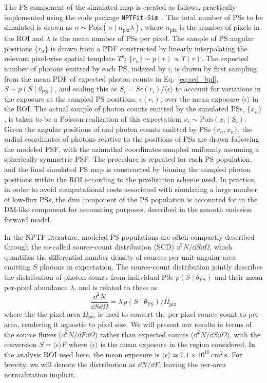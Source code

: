 \documentclass[prd,aps,10pt,nofootinbib,twocolumn,superscriptaddress,preprintnumbers,balancelastpage,longbibliography]{revtex4-1}
\begin{document}
The PS component of the simulated \Fermi map is created as follows, practically implemented using the code package \texttt{NPTFit-Sim}~\cite{NPTFit-Sim}. The total number of PSs to be simulated is drawn as $n \sim \mathrm{Pois}(n\mid n_\mathrm{pix}\lambda)$, where $n_\mathrm{pix}$ is the number of pixels in the ROI and $\lambda$ is the mean number of PSs per pixel. The sample of PS angular positions $\{r_n\}$ is drawn from a PDF constructed by linearly interpolating the relevant pixel-wise spatial template $T^p$; $\{r_n\} \sim p(r) \propto T(r)$. The expected number of photons emitted by each PS, indexed by $i$, is drawn by first sampling from the mean PDF of expected photon counts in Eq.~\eqref{eq:scd_bpl}, $S \sim p\left({S}\mid\theta_\mathrm{PS}\right)$, and scaling this as ${S_i} = S \epsilon(r_i) / \langle \epsilon \rangle$ to account for variations in the \Fermi exposure at the sampled PS positions, $\epsilon(r_i)$, over the mean exposure $\langle \epsilon \rangle$ in the ROI. The actual sample of photon counts emitted by the simulated PSs, $\{x_n\}$, is taken to be a Poisson realization of this expectation; ${x_i} \sim \mathrm{Pois}\left({x_i}\mid {S_i}\right)$. Given the angular positions of and photon counts emitted by PSs $\{r_n, x_n\}$, the radial coordinates of photons relative to the positions of PSs are drawn following the modeled \Fermi PSF, with the azimuthal coordinates sampled uniformly assuming a spherically-symmetric PSF. The procedure is repeated for each PS population, and the final simulated PS map is constructed by binning the sampled photon positions within the ROI according to the pixelization scheme used. In practice, in order to avoid computational costs associated with simulating a large number of low-flux PSs, the dim component of the PS population is accounted for in the DM-like component for accounting purposes, described in the smooth emission forward model.

In the NPTF literature, modeled PS populations are often compactly described through the so-called source-count distribution (SCD) $\dd^2 N /\dd S \dd\Omega$, which quantifies the differential number density of sources per unit angular area emitting $S$ photons in expectation. The source-count distribution jointly describes the distribution of photon counts from individual PSs $p(S\mid\theta_\mathrm{PS})$ and their mean per-pixel abundance $\lambda$, and is related to these as
\begin{equation}
\label{eq:scd_ps}
\frac{\dd^2 N}{\dd S\dd\Omega}=\lambda \, p(S\mid\theta_\mathrm{PS}) / \Omega_\mathrm{pix}
\end{equation}
where the the pixel area $\Omega_\mathrm{pix}$ is used to convert the per-pixel source count to per-area, rendering it agnostic to pixel size. We will present our results in terms of the source fluxes ($\dd^2 N /\dd F\dd\Omega$) rather than expected counts ($\dd^2 N /\dd S\dd\Omega$), with the conversion $S = \langle \epsilon \rangle F$ where $\langle \epsilon \rangle$ is the mean exposure in the region considered. In the analysis ROI used here, the mean exposure is $\langle \epsilon \rangle \simeq 7.1\times 10^{10}\,\mathrm{cm}^{2}\,\mathrm{s}$. For brevity, we will denote the distribution as $\dd N /\dd F$, leaving the per-area normalization implicit. 
\end{document}
